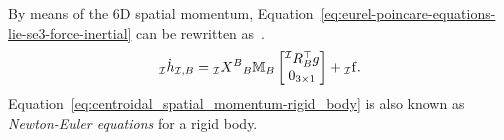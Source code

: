 By means of the 6D spatial momentum, Equation~\eqref{eq:eurel-poincare-equations-lie-se3-force-inertial} can be rewritten as~\citep{Featherstone2014}.
\begin{equation}
    \label{eq:centroidal_spatial_momentum-rigid_body}
    {}_{\mathcal{I}} \dot{h}_{\mathcal{I}, B}  = {}_{\mathcal{I}} X ^B {}_B \mathbb{M} _ B \begin{bmatrix} 
      {}^{\mathcal{I}} R _ B ^\top g \\ 
      0_{3\times1}
     \end{bmatrix} + {}_{\mathcal{I}} \mathrm{f}.
\end{equation}
Equation~\eqref{eq:centroidal_spatial_momentum-rigid_body} is also known as \emph{Newton-Euler equations} for a rigid body.